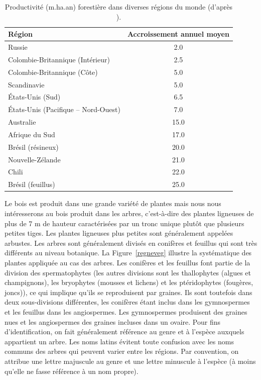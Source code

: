\begin{table}[ht]
\centering
	
	\begin{tabular}{l c}
	\hline
	\bf Région	& \bf Accroissement annuel moyen \\
	\hline
	\hline
	Russie &  2.0\\
	Colombie-Britannique (Intérieur)  & 2.5 \\
	Colombie-Britannique (Côte)  & 5.0 \\
	Scandinavie &  5.0 \\
	États-Unis (Sud) &  6.5\\
	États-Unis (Pacifique – Nord-Ouest) &  7.0 \\
	Australie &  15.0 \\
	Afrique du Sud &  17.0 \\
	Brésil (résineux) & 20.0 \\
	Nouvelle-Zélande &  21.0 \\
	Chili &  22.0 \\
	Brésil (feuillus) & 25.0 \\
	\hline
	\end{tabular}

\caption{\label{accroissement} Productivité (m.ha.an) forestière dans diverses régions du monde (d'après \cite{MRN1996}).}
\end{table}

Le bois est produit dans une grande variété de plantes mais nous nous intéresserons au bois produit dans les arbres, c'est-à-dire des plantes ligneuses de plus de 7 m de hauteur caractérisées par un tronc unique plutôt que plusieurs petites tiges. Les plantes ligneuses plus petites sont généralement appelées arbustes. Les arbres sont généralement divisés en conifères et feuillus qui sont très différents au niveau botanique. La Figure~\ref{regneveg} illustre la systématique des plantes appliquée au cas des arbres. Les conifères et les feuillus font partie de la division des spermatophytes (les autres divisions sont les thallophytes (algues et champignons), les bryophytes (mousses et lichens) et les ptéridophytes (fougères, joncs)), ce qui implique qu'ils se reproduisent par graines. Ils sont toutefois dans deux sous-divisions différentes, les conifères étant inclus dans les gymnospermes et les feuillus dans les angiospermes. Les gymnospermes produisent des graines nues et les angiospermes des graines incluses dans un ovaire. Pour fins d'identification, on fait généralement référence au genre et à l'espèce auxquels appartient un arbre. Les noms latins évitent toute confusion avec les noms communs des arbres qui peuvent varier entre les régions. Par convention, on attribue une lettre majuscule au genre et une lettre minuscule à l'espèce (à moins qu'elle ne fasse référence à un nom propre).\\


